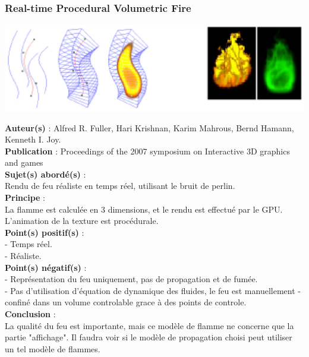 \documentclass[a4paper,10pt]{article}
\begin{document}
\subsubsection{Real-time Procedural Volumetric Fire}
    \begin{center}
	\includegraphics[scale=0.5]{Volumetric.ps}
    \end{center}
\textbf{Auteur(s)} : Alfred R. Fuller, Hari Krishnan, Karim Mahrous, Bernd Hamann, Kenneth I. Joy.\\
\textbf{Publication} : Proceedings of the 2007 symposium on Interactive 3D graphics and games\\
\textbf{Sujet(s) abordé(s)} : \\
	Rendu de feu réaliste en temps réel, utilisant le bruit de perlin.\\
\textbf{Principe} :\\
	La flamme est calculée en 3 dimensions, et le rendu est effectué par le GPU.\\
	L'animation de la texture est procédurale.\\	
\textbf{Point(s) positif(s)} :\\
	- Temps réel.\\
	- Réaliste.\\
\textbf{Point(s) négatif(s)} :\\
	- Représentation du feu uniquement, pas de propagation et de fumée.\\
	- Pas d'utilisation d'équation de dynamique des fluides, le feu est manuellement 
	- confiné dans un volume controlable grace à des points de controle.\\
\textbf{Conclusion} :\\
	La qualité du feu est importante, mais ce modèle de flamme ne concerne que 
	la partie "affichage". Il faudra voir si le modèle de propagation choisi 
	peut utiliser un tel modèle de flammes.
\end{document}
